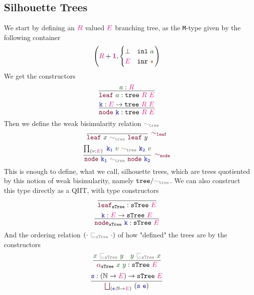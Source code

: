 \documentclass[twoside,11pt,openright]{report}
\theoremstyle{plain} %
\theoremstyle{definition}
\theoremstyle{remark}
\newcommand*{\term}[1]{\textcolor{green!30!black}{#1}} %
\newcommand*{\type}[1]{\textcolor{magenta!90!black}{#1}}
\newcommand*{\unit}{\type{\textbf{1}}}
\newcommand*{\relation}[1]{\textcolor{gray}{\ensuremath{\mathtt{#1}}}}
\newcommand*{\constant}[1]{\textcolor{orange!60!black}{\ensuremath{\mathtt{#1}}}}
\newcommand*{\function}[1]{\textcolor{blue!60!black}{\ensuremath{\mathtt{#1}}}}
\newcommand*{\constructor}[1]{\textcolor{purple!60!black}{\ensuremath{\mathtt{#1}}}}
\newcommand*{\typeformer}[1]{\ensuremath{\mathtt{#1}}}
\newcommand*{\unitelem}{\constant{\star}} %
\begin{document}
\subsection{Silhouette Trees}
We start by defining an \(\type{R}\) valued \(\type{E}\) branching tree, as the \texttt{M}-type given by the following container
\begin{equation}
  \left(\type{R} + \unit , \begin{cases} \bot & \mathtt{inl}~\term{a} \\ \type{E} & \mathtt{inr}~\unitelem \end{cases}\right)
\end{equation}
We get the constructors
\begin{equation}
  \infer{\constructor{leaf}~\term{a} : \typeformer{tree}~\type{R}~\type{E}}{\term{a} : \type{R}}
\end{equation}
\begin{equation}
  \infer{\constructor{node}~\function{k} : \typeformer{tree}~\type{R}~\type{E}}{\function{k} : \type{E} \rightarrow \typeformer{tree}~\type{R}~\type{E}}
\end{equation}
Then we define the weak bisimularity relation \(\relation{\sim_{tree}}\)
\begin{equation}
  \infer[\constructor{\sim_{leaf}}]{\constructor{leaf}~x~\relation{\sim_{tree}}~\constructor{leaf}~y}{}
\end{equation}
\begin{equation}
  \infer[\constructor{\sim_{node}}]{\constructor{node}~\function{k_1}~\relation{\sim_{tree}}~\constructor{node}~\function{k_2}}{\prod_{(v : \type{E})}~\function{k_1}~\term{v}~\relation{\sim_{tree}}~\function{k_2}~\term{v}}
\end{equation}
This is enough to define, what we call, silhouette trees, which are trees quotiented by this notion of weak bisimularity, namely \(\typeformer{tree} / \relation{\sim_{tree}}\). We can also construct this type directly as a QIIT, with type constructors 
\begin{equation}
  \infer{\constructor{leaf}_{\typeformer{sTree}} : \typeformer{sTree}~\type{E}}{}
\end{equation}
\begin{equation}
  \infer{\constructor{node}_{\typeformer{sTree}}~\function{k} : \typeformer{sTree}~\type{E}}{\function{k} : \type{E} \rightarrow \typeformer{sTree}~\type{E}}
\end{equation}
And the ordering relation \((\cdot~\relation{\sqsubseteq_{sTree}}~\cdot)\) of how "defined" the trees are by the constructors 
\begin{equation}
  \infer{\constructor{\alpha}_{\typeformer{sTree}}~\term{x}~\term{y} : \typeformer{sTree}~\type{E}}{\term{x}~\relation{\sqsubseteq_{sTree}}~\term{y} & \term{y}~\relation{\sqsubseteq_{sTree}}~\term{x}}
\end{equation}
\begin{equation}
  \infer{\mathop{\constructor{\bigsqcup}}_{(\function{e} : \mathbb{N} \rightarrow \type{E})}~(\function{s}~\function{e})}{\function{s} : (\mathbb{N} \rightarrow \type{E}) \rightarrow \typeformer{sTree}~\type{E}}
\end{equation}
\end{document}
